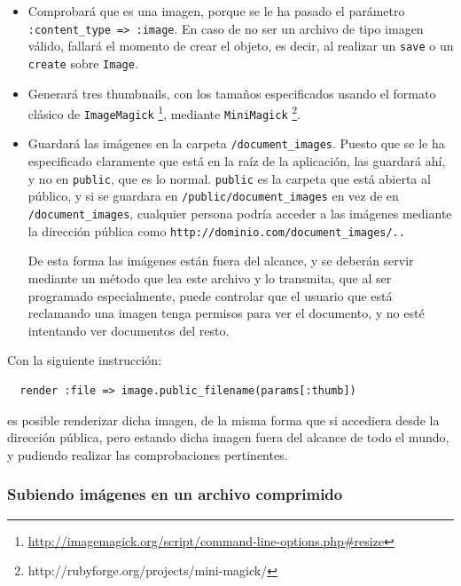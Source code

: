\begin{itemize}
  \item Comprobará que es una imagen, porque se le ha pasado el parámetro \texttt{:content\_type => :image}. En caso de no ser un archivo de tipo imagen válido, fallará el momento de crear el objeto, es decir, al realizar un \texttt{save} o un \texttt{create} sobre \texttt{Image}.
  \item Generará tres thumbnails, con los tamaños especificados usando el formato clásico de \texttt{ImageMagick} \footnote{\url{http://imagemagick.org/script/command-line-options.php\#resize}}, mediante \texttt{MiniMagick} \footnote{http://rubyforge.org/projects/mini-magick/}.
  \item Guardará las imágenes en la carpeta \texttt{/document\_images}. Puesto que se le ha especificado claramente que está en la raíz de la aplicación, las guardará ahí, y no en \texttt{public}, que es lo normal. \texttt{public} es la carpeta que está abierta al público, y si se guardara en \texttt{/public/document\_images} en vez de en \texttt{/document\_images}, cualquier persona podría acceder a las imágenes mediante la dirección pública como \texttt{http://dominio.com/document\_images/..}
  
  De esta forma las imágenes están fuera del alcance, y se deberán servir mediante un método que lea este archivo y lo transmita, que al ser programado especialmente, puede controlar que el usuario que está reclamando una imagen tenga permisos para ver el documento, y no esté intentando ver documentos del resto.
\end{itemize}

Con la siguiente instrucción:

\begin{verbatim}
  render :file => image.public_filename(params[:thumb])
\end{verbatim}

es posible renderizar dicha imagen, de la misma forma que si accediera desde la dirección pública, pero estando dicha imagen fuera del alcance de todo el mundo, y pudiendo realizar las comprobaciones pertinentes.


\subsubsection{Subiendo imágenes en un archivo comprimido} %
\label{ssub:subiendo_imágenes_en_un_archivo_comprimido}

